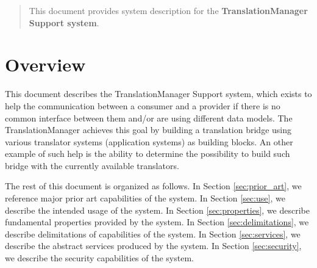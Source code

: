 \documentclass[a4paper]{arrowhead}
\begin{document}
\ArrowheadDate{\today}
\ArrowheadSetup

\begin{center}
  \vspace*{1cm}
  \huge{\arrowtitle}

  \vspace*{0.2cm}
  \LARGE{\arrowtype}
  \vspace*{1cm}

  \vspace*{\fill}


  \vspace*{1cm}
  \vspace*{\fill}

  \begin{abstract}
    This document provides system description for the \textbf{TranslationManager Support system}.
  \end{abstract}

  \vspace*{1cm}

 \end{center}

\newpage

\tableofcontents
\newpage

\section{Overview}
\label{sec:overview}
\color{black}
This document describes the TranslationManager Support system, which exists to help the communication between a consumer and a provider if there is no common interface between them and/or are using different data models.  The TranslationManager achieves this goal by building a translation bridge using various translator systems (application systems) as building blocks. An other example of such help is the ability to determine the possibility to build such bridge with the currently available translators.

The rest of this document is organized as follows.
In Section \ref{sec:prior_art}, we reference major prior art capabilities
of the system.
In Section \ref{sec:use}, we describe the intended usage of the system.
In Section \ref{sec:properties}, we describe fundamental properties
provided by the system.
In Section \ref{sec:delimitations}, we describe delimitations of capabilities
of the system.
In Section \ref{sec:services}, we describe the abstract services produced by the system.
In Section \ref{sec:security}, we describe the security capabilities
of the system.
\end{document}
